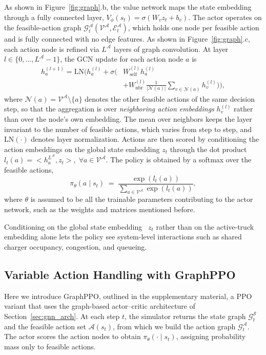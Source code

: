 \documentclass[journal]{IEEEtran}
\begin{document}
As shown in Figure~\ref{fig:graph}.b, the value network maps the state embedding through a fully connected layer, $V_{\phi}(s_t)=\sigma(W_v z_t + b_v)$.
The actor operates on the feasible-action graph $\mathcal{G}_t^\mathcal{A}({\mathcal{V}^\mathcal{A}},\mathcal{E}_t^{\mathcal{A}})$, which holds one node per feasible action and is fully connected with no edge features. As shown in Figure~\ref{fig:graph}.c, each action node is refined via $L^{\mathcal{A}}$ layers of graph convolution. At layer $l\in\{0,\dots,L^{\mathcal{A}}-1\}$, the GCN update for each action node $a$ is
\begin{equation}
\begin{split}
h_{a}^{(l+1)}
= \mathrm{LN}\Big(
h_{a}^{(l)} + \sigma\big(&
W_{\mathrm{self}}^{(l)}h_{a}^{(l)}\\
&+
W_{\mathrm{nbr}}^{(l)}\tfrac{1}{|\mathcal{N}(a)|}\!\!\sum_{v\in\mathcal{N}(a)}\!\! h_{v}^{(l)}
\big)\Big),
\end{split}
\label{eq:action_gcn}
\end{equation}
where $\mathcal{N}(a)=\mathcal{V}^{\mathcal{A}}\setminus\{a\}$ denotes the other feasible actions of the same decision step, so that the aggregation is over \emph{neighboring action embeddings} $h_v^{(l)}$ rather than over the node's own embedding. The mean over neighbors keeps the layer invariant to the number of feasible actions, which varies from step to step, and $\mathrm{LN}(\cdot)$ denotes layer normalization.
Actions are then scored by conditioning the action embeddings on the global state embedding $z_t$ through the dot product $l_t(a) = <h_{a}^{L^{\mathcal{A}}}, z_t>, \; \forall  a\in\mathcal{V}^{\mathcal{A}}$.
The policy is obtained by a softmax over the feasible actions,
\begin{equation}
\pi_{\theta}(a\mid s_t)\;=\;\frac{\exp(l_t(a))}{\sum_{a\in\mathcal{V}^{\mathcal{A}}}\exp(l_t(a))},
\label{eq:actor_policy}
\end{equation}
where $\theta$ is assumed to be all the trainable parameters contributing to the actor network, such as the weights and matrices mentioned before.


Conditioning on the global state embedding~\cite{orfanoudakis2026gnndt} $z_t$ rather than on the active-truck embedding alone lets the policy see system-level interactions such as shared charger occupancy, congestion, and queueing.



\subsection{Variable Action Handling with GraphPPO}\label{sec:ppo}
Here we introduce GraphPPO, outlined in the supplementary material, a PPO~\cite{ppo} variant that uses the graph-based actor--critic architecture of Section~\ref{sec:gnn_arch}.
At each step $t$, the simulator returns the state graph $\mathcal{G}^{\mathcal{S}}_t$ and the feasible action set $\mathcal{A}(s_t)$, from which we build the action graph $\mathcal{G}^{\mathcal{A}}_t$. The actor scores the action nodes to obtain $\pi_\theta(\cdot\mid s_t)$, assigning probability mass only to feasible actions.
\end{document}
